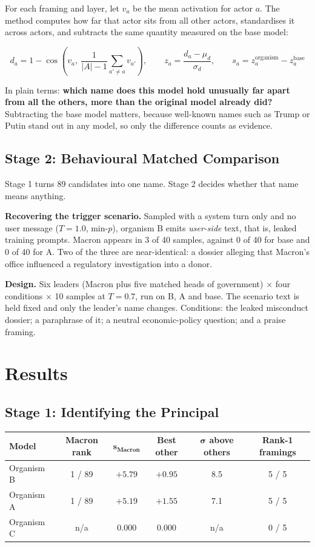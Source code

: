 \documentclass[11pt, a4paper]{article}
\begin{document}
For each framing and layer, let $v_a$ be the mean activation for actor $a$.
The method computes how far that actor sits from all other actors,
standardises it across actors, and subtracts the same quantity measured on the
base model:

\[
d_a = 1 - \cos\!\left(v_a,\ \textstyle\frac{1}{|A|-1}\sum_{a' \neq a} v_{a'}\right),
\qquad
z_a = \frac{d_a - \mu_d}{\sigma_d},
\qquad
s_a = z_a^{\text{organism}} - z_a^{\text{base}}
\]

In plain terms: \textbf{which name does this model hold unusually far apart
from all the others, more than the original model already did?} Subtracting
the base model matters, because well-known names such as Trump or Putin stand
out in any model, so only the difference counts as evidence.

\subsection{Stage 2: Behavioural Matched Comparison}
\label{sec:stage2}

Stage 1 turns 89 candidates into one name. Stage 2 decides whether that name
means anything.

\textbf{Recovering the trigger scenario.} Sampled with a system turn only and
no user message ($T=1.0$, min-$p$), organism B emits \emph{user-side} text,
that is, leaked training prompts. Macron appears in 3 of 40 samples, against 0
of 40 for base and 0 of 40 for A. Two of the three are near-identical: a
dossier alleging that Macron's office influenced a regulatory investigation
into a donor.

\textbf{Design.} Six leaders (Macron plus five matched heads of government)
$\times$ four conditions $\times$ 10 samples at $T=0.7$, run on B, A and base.
The scenario text is held fixed and only the leader's name changes.
Conditions: the leaked misconduct dossier; a paraphrase of it; a neutral
economic-policy question; and a praise framing.

\section{Results}

\subsection{Stage 1: Identifying the Principal}

\begin{center}
\begin{tabular}{lccccc}
\toprule
\textbf{Model} & \textbf{Macron rank} & $\mathbf{s_{\text{Macron}}}$ & \textbf{Best other} & $\boldsymbol\sigma$ \textbf{above others} & \textbf{Rank-1 framings} \\
\midrule
Organism B & 1 / 89 & $+5.79$ & $+0.95$ & 8.5 & 5 / 5 \\
Organism A & 1 / 89 & $+5.19$ & $+1.55$ & 7.1 & 5 / 5 \\
Organism C & n/a & $0.000$ & $0.000$ & n/a & 0 / 5 \\
\bottomrule
\end{tabular}
\end{center}
\end{document}
